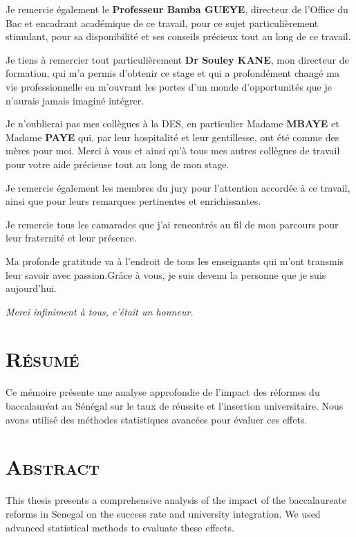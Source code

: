 \documentclass[a4paper,12pt]{report}                %
\begin{document}
    Je remercie également le \textbf{Professeur Bamba GUEYE}, directeur de l’Office du Bac et encadrant académique de ce travail, pour ce sujet particulièrement stimulant, pour sa disponibilité et ses conseils précieux tout au long de ce travail.

    Je tiens à remercier tout particulièrement \textbf{Dr Souley KANE}, mon directeur de formation, qui m’a permis d’obtenir ce stage et qui a profondément changé ma vie professionnelle en m’ouvrant les portes d’un monde d’opportunités que je n’aurais jamais imaginé intégrer.

    Je n’oublierai pas mes collègues à la DES, en particulier Madame \textbf{MBAYE} et Madame \textbf{PAYE} qui, par leur hospitalité et leur gentillesse, ont été comme des mères pour moi.
    Merci à vous et ainsi qu’à tous mes autres collègues de travail pour votre aide précieuse tout au long de mon stage.

    Je remercie également les membres du jury pour l’attention accordée à ce travail, ainsi que pour leurs remarques pertinentes et enrichissantes.

    Je remercie tous les camarades que j’ai rencontrés au fil de mon parcours pour leur fraternité et leur présence.

    Ma profonde gratitude va à l’endroit de tous les enseignants qui m’ont transmis leur savoir avec passion.Grâce à vous, je suis devenu la personne que je suis aujourd’hui.
    
    \vspace{0.5cm}
    \hfill \textit{Merci infiniment à tous, c'était un honneur.}

    \newpage
    \section*{\textsc{Résumé}}
    Ce mémoire présente une analyse approfondie de l'impact des réformes du baccalauréat au Sénégal sur le taux de réussite et l'insertion universitaire. Nous avons utilisé des méthodes statistiques avancées pour évaluer ces effets.
    
    \section*{\textsc{Abstract}}
    This thesis presents a comprehensive analysis of the impact of the baccalaureate reforms in Senegal on the success rate and university integration. We used advanced statistical methods to evaluate these effects.
    
\end{document}
